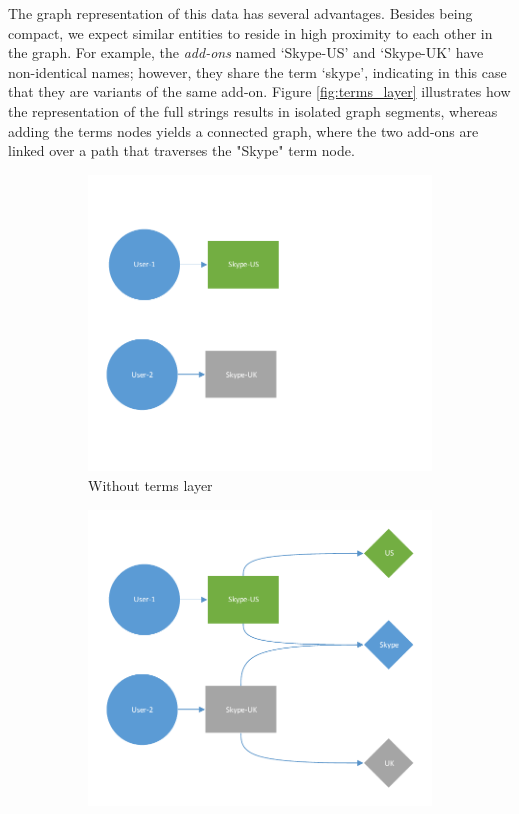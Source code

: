 \documentclass[11pt,oneside]{book}
\begin{document}
The graph representation of this data has several advantages. Besides being compact, we expect similar entities to reside in high proximity to each other in the graph. For example, the {\it add-ons} named `Skype-US' and `Skype-UK' have non-identical names; however, they share the term `skype', indicating in this case that they are variants of the same add-on. Figure \ref{fig:terms_layer} illustrates how the representation of the full strings results in isolated graph segments, whereas adding the terms nodes yields a connected graph, where the two add-ons are linked over a path that traverses the "Skype" term node.

\begin{figure}[h]
\centering
\begin{subfigure}[b]{0.49\textwidth}
	\centering
	\includegraphics[width=\textwidth]{figures/skype_exampe1.pdf}
	\caption{Without terms layer}
\end{subfigure}
\begin{subfigure}[b]{0.49\textwidth}
	\centering
	\includegraphics[width=\textwidth]{figures/skype_exampe2.pdf}

\end{subfigure}
\end{figure}
\end{document}
